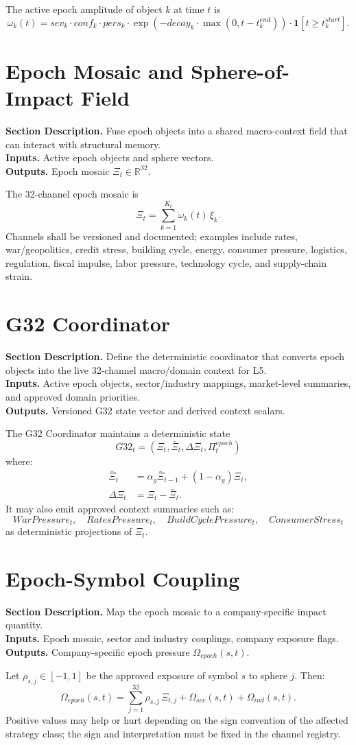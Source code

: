 \documentclass[11pt]{report}
\newcommand{\meta}[3]{\textbf{Section Description.} #1\\
\textbf{Inputs.} #2\\
\textbf{Outputs.} #3\par}
\begin{document}
The active epoch amplitude of object $k$ at time $t$ is
\[
\omega_k(t)=sev_k\cdot conf_k\cdot pers_k\cdot \exp(-decay_k\cdot \max(0,t-t_k^{end}))\cdot \mathbf{1}[t\ge t_k^{start}].
\]

\section{Epoch Mosaic and Sphere-of-Impact Field}
\meta{Fuse epoch objects into a shared macro-context field that can interact with structural memory.}{Active epoch objects and sphere vectors.}{Epoch mosaic $\Xi_t \in \mathbb{R}^{32}$.}

The 32-channel epoch mosaic is
\[
\Xi_t = \sum_{k=1}^{K_t} \omega_k(t)\,\xi_k.
\]
Channels shall be versioned and documented; examples include rates, war/geopolitics, credit stress, building cycle, energy, consumer pressure, logistics, regulation, fiscal impulse, labor pressure, technology cycle, and supply-chain strain.

\section{G32 Coordinator}
\meta{Define the deterministic coordinator that converts epoch objects into the live 32-channel macro/domain context for L5.}{Active epoch objects, sector/industry mappings, market-level summaries, and approved domain priorities.}{Versioned G32 state vector and derived context scalars.}

The G32 Coordinator maintains a deterministic state
\[
G32_t = (\Xi_t,\bar \Xi_t,\Delta \Xi_t,\Pi_t^{epoch})
\]
where:
\begin{align*}
\bar \Xi_t &= \alpha_g \bar \Xi_{t-1} + (1-\alpha_g)\Xi_t,\\
\Delta \Xi_t &= \Xi_t-\bar \Xi_t.
\end{align*}
It may also emit approved context summaries such as:
\[
WarPressure_t,\quad RatesPressure_t,\quad BuildCyclePressure_t,\quad ConsumerStress_t
\]
as deterministic projections of $\Xi_t$.

\section{Epoch-Symbol Coupling}
\meta{Map the epoch mosaic to a company-specific impact quantity.}{Epoch mosaic, sector and industry couplings, company exposure flags.}{Company-specific epoch pressure $\Omega_{epoch}(s,t)$.}

Let $\rho_{s,j}\in[-1,1]$ be the approved exposure of symbol $s$ to sphere $j$. Then:
\[
\Omega_{epoch}(s,t)=\sum_{j=1}^{32}\rho_{s,j}\,\Xi_{t,j} + \Omega_{sec}(s,t)+\Omega_{ind}(s,t).
\]
Positive values may help or hurt depending on the sign convention of the affected strategy class; the sign and interpretation must be fixed in the channel registry.
\end{document}
